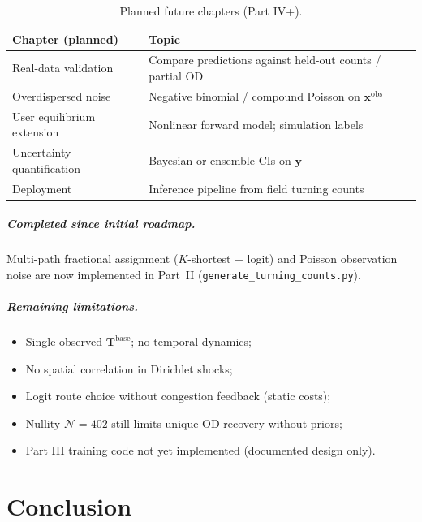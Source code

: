 \documentclass[11pt,a4paper]{report}
\newcommand{\Tbase}{\mathbf{T}^{\mathrm{base}}}
\newcommand{\mathbfy}{\mathbf{y}}
\newcommand{\mathbfx}{\mathbf{x}}
\begin{document}
\begin{table}[ht]
\centering
\caption{Planned future chapters (Part IV+).}
\label{tab:future}
\begin{tabular}{@{}ll@{}}
\toprule
\textbf{Chapter (planned)} & \textbf{Topic} \\
\midrule
Real-data validation & Compare predictions against held-out counts / partial OD \\
Overdispersed noise & Negative binomial / compound Poisson on $\mathbfx^{\mathrm{obs}}$ \\
User equilibrium extension & Nonlinear forward model; simulation labels \\
Uncertainty quantification & Bayesian or ensemble CIs on $\mathbfy$ \\
Deployment & Inference pipeline from field turning counts \\
\bottomrule
\end{tabular}
\end{table}

\paragraph{Completed since initial roadmap.}
Multi-path fractional assignment ($K$-shortest + logit) and Poisson observation noise are now implemented in Part~II (\texttt{generate\_turning\_counts.py}).

\paragraph{Remaining limitations.}
\begin{itemize}[leftmargin=*]
    \item Single observed $\Tbase$; no temporal dynamics;
    \item No spatial correlation in Dirichlet shocks;
    \item Logit route choice without congestion feedback (static costs);
    \item Nullity $\mathcal{N}=402$ still limits unique OD recovery without priors;
    \item Part III training code not yet implemented (documented design only).
\end{itemize}


\chapter*{Conclusion}
\end{document}
